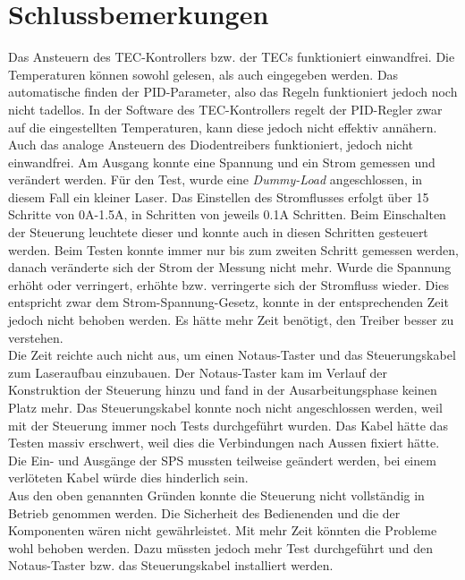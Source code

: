 \section{Schlussbemerkungen}
Das Ansteuern des TEC-Kontrollers bzw. der TECs funktioniert einwandfrei. Die Temperaturen können sowohl gelesen, als auch eingegeben werden. Das automatische finden der PID-Parameter, also das Regeln funktioniert jedoch noch nicht tadellos. In der Software des TEC-Kontrollers regelt der PID-Regler zwar auf die eingestellten Temperaturen, kann diese jedoch nicht effektiv annähern.\\
Auch das analoge Ansteuern des Diodentreibers funktioniert, jedoch nicht einwandfrei. Am Ausgang konnte eine Spannung und ein Strom gemessen und verändert werden. Für den Test, wurde eine \textit{Dummy-Load}  angeschlossen, in diesem Fall ein kleiner Laser. Das Einstellen des Stromflusses erfolgt über 15 Schritte von 0A-1.5A, in Schritten von jeweils 0.1A Schritten. Beim Einschalten der Steuerung leuchtete dieser und konnte auch in diesen Schritten gesteuert werden.  Beim Testen konnte immer nur bis zum zweiten Schritt gemessen werden, danach veränderte sich der Strom der Messung nicht mehr. Wurde die Spannung erhöht oder verringert, erhöhte bzw. verringerte sich der Stromfluss wieder. Dies entspricht zwar dem Strom-Spannung-Gesetz, konnte in der entsprechenden Zeit jedoch nicht behoben werden. Es hätte mehr Zeit benötigt, den Treiber besser zu verstehen.\\
Die Zeit reichte auch nicht aus, um einen Notaus-Taster und das Steuerungskabel zum Laseraufbau einzubauen. Der Notaus-Taster kam im Verlauf der Konstruktion der Steuerung hinzu und fand in der Ausarbeitungsphase keinen Platz mehr. Das Steuerungskabel konnte noch nicht angeschlossen werden, weil mit der Steuerung immer noch Tests durchgeführt wurden. Das Kabel hätte das Testen massiv erschwert, weil dies die Verbindungen nach Aussen fixiert hätte. Die Ein- und Ausgänge der SPS mussten teilweise geändert werden, bei einem verlöteten Kabel würde dies hinderlich sein.\\
Aus den oben genannten Gründen konnte die Steuerung nicht vollständig in Betrieb genommen werden. Die Sicherheit des Bedienenden und die der Komponenten wären nicht gewährleistet. Mit mehr Zeit könnten die Probleme wohl behoben werden. Dazu müssten jedoch mehr Test durchgeführt und den Notaus-Taster bzw. das Steuerungskabel installiert werden.\\

